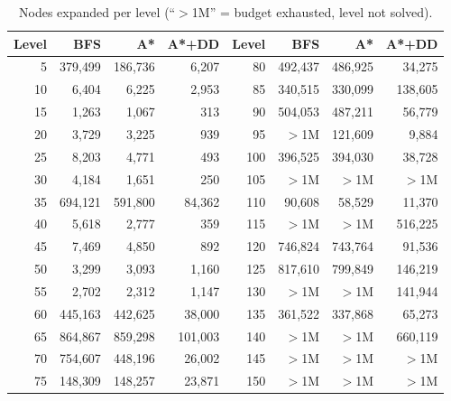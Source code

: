 \begin{table}[t]
\centering
\caption{Nodes expanded per level (``$>$1M'' = budget exhausted, level not solved).}
\label{tab:nodes}
\footnotesize
\begin{tabular}{rrrr@{\hspace{2em}}rrrr}
\toprule
Level & BFS & A* & A*+DD & Level & BFS & A* & A*+DD \\
\midrule
5 & 379{,}499 & 186{,}736 & 6{,}207 & 80 & 492{,}437 & 486{,}925 & 34{,}275 \\
10 & 6{,}404 & 6{,}225 & 2{,}953 & 85 & 340{,}515 & 330{,}099 & 138{,}605 \\
15 & 1{,}263 & 1{,}067 & 313 & 90 & 504{,}053 & 487{,}211 & 56{,}779 \\
20 & 3{,}729 & 3{,}225 & 939 & 95 & $>$1M & 121{,}609 & 9{,}884 \\
25 & 8{,}203 & 4{,}771 & 493 & 100 & 396{,}525 & 394{,}030 & 38{,}728 \\
30 & 4{,}184 & 1{,}651 & 250 & 105 & $>$1M & $>$1M & $>$1M \\
35 & 694{,}121 & 591{,}800 & 84{,}362 & 110 & 90{,}608 & 58{,}529 & 11{,}370 \\
40 & 5{,}618 & 2{,}777 & 359 & 115 & $>$1M & $>$1M & 516{,}225 \\
45 & 7{,}469 & 4{,}850 & 892 & 120 & 746{,}824 & 743{,}764 & 91{,}536 \\
50 & 3{,}299 & 3{,}093 & 1{,}160 & 125 & 817{,}610 & 799{,}849 & 146{,}219 \\
55 & 2{,}702 & 2{,}312 & 1{,}147 & 130 & $>$1M & $>$1M & 141{,}944 \\
60 & 445{,}163 & 442{,}625 & 38{,}000 & 135 & 361{,}522 & 337{,}868 & 65{,}273 \\
65 & 864{,}867 & 859{,}298 & 101{,}003 & 140 & $>$1M & $>$1M & 660{,}119 \\
70 & 754{,}607 & 448{,}196 & 26{,}002 & 145 & $>$1M & $>$1M & $>$1M \\
75 & 148{,}309 & 148{,}257 & 23{,}871 & 150 & $>$1M & $>$1M & $>$1M \\
\bottomrule
\end{tabular}
\end{table}
